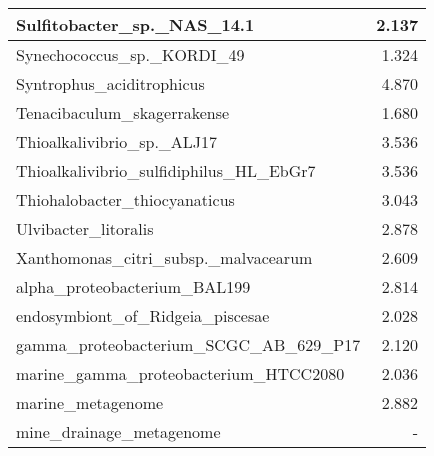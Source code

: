 \documentclass[12pt,a4paper]{article}
\begin{document}
\begin{table}[ht]
\begin{center}
\begin{tabular}{|l*{1}{|r}|}
Sulfitobacter\_sp.\_NAS\_14.1 & 2.137 \\ \hline
Synechococcus\_sp.\_KORDI\_49 & 1.324 \\ \hline
Syntrophus\_aciditrophicus & 4.870 \\ \hline
Tenacibaculum\_skagerrakense & 1.680 \\ \hline
Thioalkalivibrio\_sp.\_ALJ17 & 3.536 \\ \hline
Thioalkalivibrio\_sulfidiphilus\_HL\_EbGr7 & 3.536 \\ \hline
Thiohalobacter\_thiocyanaticus & 3.043 \\ \hline
Ulvibacter\_litoralis & 2.878 \\ \hline
Xanthomonas\_citri\_subsp.\_malvacearum & 2.609 \\ \hline
alpha\_proteobacterium\_BAL199 & 2.814 \\ \hline
endosymbiont\_of\_Ridgeia\_piscesae & 2.028 \\ \hline
gamma\_proteobacterium\_SCGC\_AB\_629\_P17 & 2.120 \\ \hline
marine\_gamma\_proteobacterium\_HTCC2080 & 2.036 \\ \hline
marine\_metagenome & 2.882 \\ \hline
mine\_drainage\_metagenome & - \\ \hline
\end{tabular}
\end{center}
\end{table}
\end{document}
